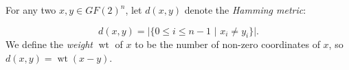 \documentclass[12pt]{article}
\newcommand{\wt}{\mathop{wt}}
\begin{document}





For any two $x,y \in GF(2)^{n}$,
let $d(x,y)$ denote the {\it Hamming metric}:

\begin{equation}
d(x,y)=|\{0\leq i\leq n-1\,\,|\,\,
x_{i}\not=y_{i}\}|.
\end{equation}
We define the {\it weight} $\wt$ of $x$ to be the number
of non-zero coordinates of $x$, so $d(x,y)=\wt(x-y)$.
\end{document}
